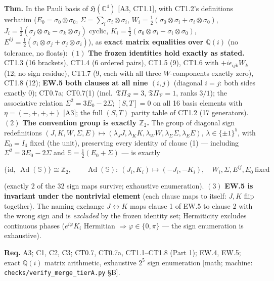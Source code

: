 \begin{theorem}\label{tag:EW-5a}
\textbf{Thm.} In the Pauli basis of $\mathfrak H(\mathbb C^4)$ [A3, CT1.1], with CT1.2's definitions verbatim ($E_0=\sigma_0\otimes\sigma_0$, $\Sigma=\sum_i\sigma_i\otimes\sigma_i$, $W_i=\tfrac12(\sigma_0\otimes\sigma_i+\sigma_i\otimes\sigma_0)$, $J_i=\tfrac12(\sigma_j\otimes\sigma_k-\sigma_k\otimes\sigma_j)$ cyclic, $K_i=\tfrac12(\sigma_0\otimes\sigma_i-\sigma_i\otimes\sigma_0)$, $E^{ij}=\tfrac12(\sigma_i\otimes\sigma_j+\sigma_j\otimes\sigma_i)$), as \textbf{exact matrix equalities over $\mathbb Q(i)$} (no tolerance, no floats): $(1)$ \textbf{The frozen identities hold exactly as stated.} CT1.3 (16 brackets), CT1.4 (6 ordered pairs), CT1.5 (9), CT1.6 with $+i\epsilon_{ijk}W_k$ (12; no sign residue), CT1.7 (9, each with all three $W$-components exactly zero), CT1.8 (12); \textbf{EW.5 both clauses at all nine $(i,j)$} (diagonal $i=j$: both sides exactly $0$); CT0.7a; CT0.7(1) (incl.\ $\mathfrak T\Pi_{\mathcal R}=3$, $\mathfrak T\Pi_{\mathcal V}=1$, ranks $3/1$); the associative relation $\Sigma^2=3E_0-2\Sigma$; $[S,T]=0$ on all 16 basis elements with $\eta=(-,+,+,+)$ [A3]; the full $(S,T)$ parity table of CT1.2 (17 generators). $(2)$ \textbf{The convention group is exactly $\mathbb Z_2$.} The group of diagonal sign redefinitions $(J,K,W,\Sigma,E)\mapsto(\lambda_JJ,\lambda_KK,\lambda_WW,\lambda_\Sigma\Sigma,\lambda_EE)$, $\lambda\in\{\pm1\}^5$, with $E_0=I_4$ fixed (the unit), preserving every identity of clause (1) — including $\Sigma^2=3E_0-2\Sigma$ and $\mathbb S=\tfrac12(E_0+\Sigma)$ — is exactly

\[
\{\mathrm{id},\ \operatorname{Ad}(\mathbb S)\}\cong\mathbb Z_2,\qquad \operatorname{Ad}(\mathbb S):\ (J_i,K_i)\mapsto(-J_i,-K_i),\quad W_i,\Sigma,E^{ij},E_0\ \text{fixed}
\]

(exactly $2$ of the $32$ sign maps survive; exhaustive enumeration). $(3)$ \textbf{EW.5 is invariant under the nontrivial element} (each clause maps to itself: $J,K$ flip together). The naming exchange $J\leftrightarrow K$ maps clause 1 of EW.5 to clause 2 with the wrong sign and is \textit{excluded} by the frozen identity set; Hermiticity excludes continuous phases ($e^{i\varphi}K_i$ Hermitian $\Rightarrow\varphi\in\{0,\pi\}$ — the sign enumeration is exhaustive).

\textbf{Req.} A3; C1, C2, C3; CT0.7, CT0.7a, CT1.1–CT1.8 (Part 1); EW.4, EW.5; exact $\mathbb Q(i)$ matrix arithmetic, exhaustive $2^5$ sign enumeration [math; machine: \texttt{checks/\allowbreak{}verify\_\allowbreak{}merge\_\allowbreak{}tierA.py} §B].


\end{theorem}
